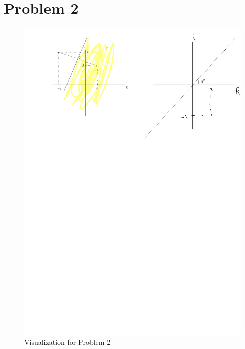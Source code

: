 \documentclass{article}
\begin{document}
\section*{Problem 2}


\begin{figure}[h!]
    \centering
    \includegraphics[width=\textwidth]{2025-04-28-Note-13-03.pdf}
    \caption{Visualization for Problem 2}
    \label{fig:problem2}
\end{figure}
\end{document}
